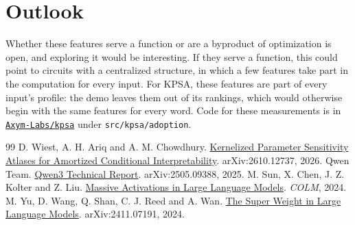\documentclass[11pt]{article}
\begin{document}
\section{Outlook}\label{outlook}

Whether these features serve a function or are a byproduct of optimization is open, and exploring it would be interesting. If they serve a function, this could point to circuits with a centralized structure, in which a few features take part in the computation for every input. For KPSA, these features are part of every input's profile: the demo leaves them out of its rankings, which would otherwise begin with the same features for every word. Code for these measurements is in \href{https://github.com/Axym-Labs/kpsa}{\texttt{Axym-Labs/kpsa}} under \texttt{src/kpsa/adoption}.

\begin{thebibliography}{99}
 D. Wiest, A. H. Ariq and A. M. Chowdhury. \href{https://arxiv.org/abs/2610.12737}{Kernelized Parameter Sensitivity Atlases for Amortized Conditional Interpretability}. arXiv:2610.12737, 2026.
 Qwen Team. \href{https://arxiv.org/abs/2505.09388}{Qwen3 Technical Report}. arXiv:2505.09388, 2025.
 M. Sun, X. Chen, J. Z. Kolter and Z. Liu. \href{https://arxiv.org/abs/2402.17762}{Massive Activations in Large Language Models}. \textit{COLM}, 2024.
 M. Yu, D. Wang, Q. Shan, C. J. Reed and A. Wan. \href{https://arxiv.org/abs/2411.07191}{The Super Weight in Large Language Models}. arXiv:2411.07191, 2024.
\end{thebibliography}
\end{document}
